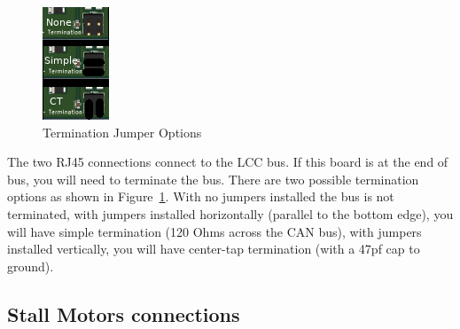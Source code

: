 \begin{figure}[hbpt]\begin{centering}%
\includegraphics{ESP32-S3-MultiFunction-termination.png}
\caption{Termination Jumper Options}
\label{fig:ESP32-S3-MultiFunction-termination}
\end{centering}\end{figure}
The two RJ45 connections connect to the LCC bus.  If this board is at the end 
of bus, you will need to terminate the bus.  There are two possible 
termination options as shown in 
Figure~\ref{fig:ESP32-S3-MultiFunction-termination}.  With no jumpers 
installed the bus is not terminated, with jumpers installed horizontally 
(parallel to the bottom edge), you will have simple termination (120 Ohms 
across the CAN bus), with jumpers installed vertically, you will have 
center-tap termination (with a 47pf cap to ground).

\subsection{Stall Motors connections}

